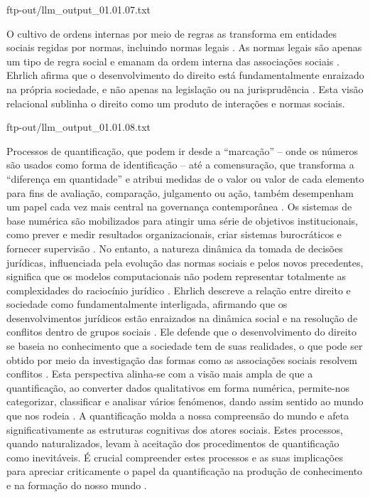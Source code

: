 \begin{agradecimentos}
    ftp-out/llm_output_01.01.07.txt 
    
    O cultivo de ordens internas por meio de regras as transforma em entidades sociais regidas por normas, incluindo normas legais \cite{venturini2024}. As normas legais são apenas um tipo de regra social e emanam da ordem interna das associações sociais \cite{venturini2024, venturini2024b}. Ehrlich afirma que o desenvolvimento do direito está fundamentalmente enraizado na própria sociedade, e não apenas na legislação ou na jurisprudência \cite{venturini2024c}. Esta visão relacional sublinha o direito como um produto de interações e normas sociais. 
    
    ftp-out/llm_output_01.01.08.txt 
    
    Processos de quantificação, que podem ir desde a “marcação” – onde os números são usados como forma de identificação – até a comensuração, que transforma a “diferença em quantidade” e atribui medidas de o valor ou valor de cada elemento para fins de avaliação, comparação, julgamento ou ação, também desempenham um papel cada vez mais central na governança contemporânea \cite{101111lsi12334}. Os sistemas de base numérica são mobilizados para atingir uma série de objetivos institucionais, como prever e medir resultados organizacionais, criar sistemas burocráticos e fornecer supervisão \cite{101111lsi12334}. No entanto, a natureza dinâmica da tomada de decisões jurídicas, influenciada pela evolução das normas sociais e pelos novos precedentes, significa que os modelos computacionais não podem representar totalmente as complexidades do raciocínio jurídico \cite{10.1007/s11186-021-09453-1,zabala2019decades}. Ehrlich descreve a relação entre direito e sociedade como fundamentalmente interligada, afirmando que os desenvolvimentos jurídicos estão enraizados na dinâmica social e na resolução de conflitos dentro de grupos sociais \cite{ehrlich1967fundamentos}. Ele defende que o desenvolvimento do direito se baseia no conhecimento que a sociedade tem de suas realidades, o que pode ser obtido por meio da investigação das formas como as associações sociais resolvem conflitos \cite{ehrlich1967fundamentos}. Esta perspectiva alinha-se com a visão mais ampla de que a quantificação, ao converter dados qualitativos em forma numérica, permite-nos categorizar, classificar e analisar vários fenómenos, dando assim sentido ao mundo que nos rodeia \cite{10.1590/dados.2022.65.3.267,10.1080 /07329113.2015.1046739}. A quantificação molda a nossa compreensão do mundo e afeta significativamente as estruturas cognitivas dos atores sociais. Estes processos, quando naturalizados, levam à aceitação dos procedimentos de quantificação como inevitáveis. É crucial compreender estes processos e as suas implicações para apreciar criticamente o papel da quantificação na produção de conhecimento e na formação do nosso mundo \cite{101057s4159902003965}. 
    

\end{agradecimentos}
